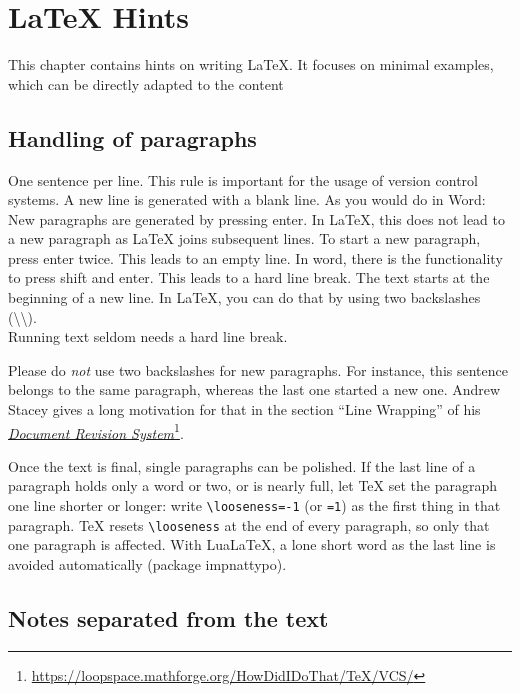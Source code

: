 \documentclass[../thesis-example-en]{subfiles}
\begin{document}
\chapter{LaTeX Hints}
\label{sec:latexhints}

This chapter contains hints on writing LaTeX.
It focuses on minimal examples, which can be directly adapted to the content

\section{Handling of paragraphs}

\begin{ltgexample}
One sentence per line.
This rule is important for the usage of version control systems.
A new line is generated with a blank line.
As you would do in Word:
New paragraphs are generated by pressing enter.
In LaTeX, this does not lead to a new paragraph as LaTeX joins subsequent lines.
To start a new paragraph, press enter twice.
This leads to an empty line.
In word, there is the functionality to press shift and enter.
This leads to a hard line break.
The text starts at the beginning of a new line.
In LaTeX, you can do that by using two backslashes (\textbackslash\textbackslash).
\\
Running text seldom needs a hard line break.

Please do \textit{not} use two backslashes for new paragraphs.
For instance, this sentence belongs to the same paragraph, whereas the last one started a new one.
Andrew Stacey gives a long motivation for that in the section \enquote{Line Wrapping} of his \href{https://loopspace.mathforge.org/HowDidIDoThat/TeX/VCS/#section.3}{\emph{Document Revision System}}\footnote{\url{https://loopspace.mathforge.org/HowDidIDoThat/TeX/VCS/}}.
\end{ltgexample}

Once the text is final, single paragraphs can be polished.
If the last line of a paragraph holds only a word or two, or is nearly full, let TeX set the paragraph one line shorter or longer: write \texttt{\textbackslash looseness=-1} (or \texttt{=1}) as the first thing in that paragraph.
TeX resets \texttt{\textbackslash looseness} at the end of every paragraph, so only that one paragraph is affected.
With LuaLaTeX, a lone short word as the last line is avoided automatically (package impnattypo).

\section{Notes separated from the text}
\end{document}
